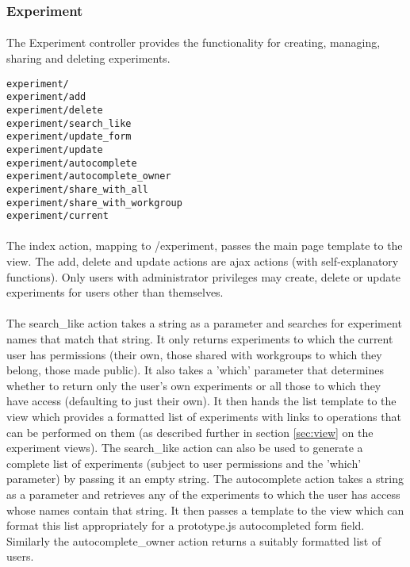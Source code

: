 \subsubsection{Experiment}
\label{sec:controller_experiment}

\paragraph{}
The Experiment controller provides the functionality for creating, managing, sharing and deleting experiments.

\begin{scriptsize}
\begin{verbatim}
experiment/
experiment/add
experiment/delete
experiment/search_like
experiment/update_form
experiment/update
experiment/autocomplete
experiment/autocomplete_owner
experiment/share_with_all
experiment/share_with_workgroup
experiment/current
\end{verbatim}
\end{scriptsize}

\paragraph{}
The index action, mapping to /experiment, passes the main page template to the view. The add, delete and update actions are ajax actions (with self-explanatory functions). Only users with administrator privileges may create, delete or update experiments for users other than themselves. 

\paragraph{}
The search\_like action takes a string as a parameter and searches for experiment names that match that string. It only returns experiments to which the current user has permissions (their own, those shared with workgroups to which they belong, those made public). It also takes a 'which' parameter that determines whether to return only the user's own experiments or all those to which they have access (defaulting to just their own). It then hands the list template to the view which provides a formatted list of experiments with links to operations that can be performed on them (as described further in section \ref{sec:view} on the experiment views). The search\_like action can also be used to generate a complete list of experiments (subject to user permissions and the 'which' parameter) by passing it an empty string. The autocomplete action takes a string as a parameter and retrieves any of the experiments to which the user has access whose names contain that string. It then passes a template to the view which can format this list appropriately for a prototype.js autocompleted form field. Similarly the autocomplete\_owner action returns a suitably formatted list of users. 

